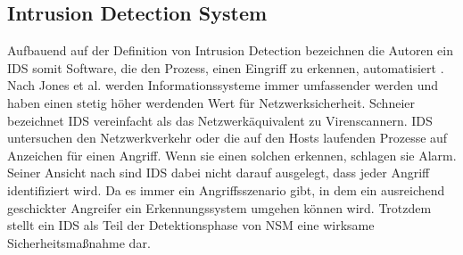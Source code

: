 \subsection{Intrusion Detection System}
Aufbauend auf der Definition von Intrusion Detection bezeichnen die Autoren ein IDS somit Software, die den Prozess, einen Eingriff zu erkennen, automatisiert \cite{scarfone2007guide}.
Nach Jones et al. \cite{jones_computer_nodate} werden Informationssysteme immer umfassender werden und haben einen stetig höher werdenden Wert für Netzwerksicherheit. 
Schneier \cite{schneier_managed_2001} bezeichnet IDS vereinfacht als das Netzwerkäquivalent zu Virenscannern. IDS untersuchen den Netzwerkverkehr oder die auf den Hosts laufenden Prozesse auf Anzeichen für einen Angriff. Wenn sie einen solchen erkennen, schlagen sie Alarm. Seiner Ansicht nach sind IDS dabei nicht darauf ausgelegt, dass jeder Angriff identifiziert wird. Da es immer ein Angriffsszenario gibt, in dem ein ausreichend geschickter Angreifer ein Erkennungssystem umgehen können wird. Trotzdem stellt ein IDS als Teil der Detektionsphase von NSM eine wirksame Sicherheitsmaßnahme dar.

